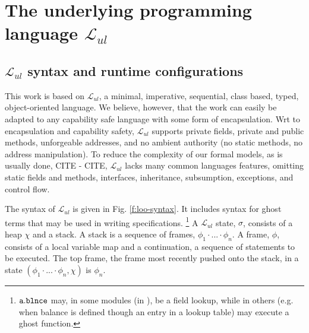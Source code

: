 \renewcommand{\LangOO}{\ensuremath{{\mathcal{L}}_{ul}}\xspace }

\section{The underlying programming language \LangOO}  
\label{sect:underlying}

\subsection{\LangOO syntax and runtime configurations}
\label{sub:Loo} 
This work is based on \LangOO, a {minimal}, imperative, sequential,  class based, typed, object-oriented language. 
We believe, however, that the work can easily be adapted to any capability safe language with some form of encapsulation. 
Wrt to encapsulation and  capability safety,  \LangOO supports private fields, private and public methods, unforgeable addresses, and no ambient authority (no static methods, no address manipulation).
To reduce the complexity of our formal models, as is usually done, CITE - CITE,  \LangOO lacks many
common languages features, omitting static fields and methods, interfaces,
inheritance, subsumption, exceptions, and control flow.  
 
 The syntax of \LangOO is given in Fig. \ref{f:loo-syntax}. It  includes syntax for ghost terms  %
 that may %
be used in writing
specifications.
\footnote{
\Eg  $\mbox{\normalfont{\texttt{a}}}.\mbox{\normalfont{\texttt{\mbox{\normalfont{\texttt{blnce}}}}}}$ may, in some modules (\eg in \ModA), be a field lookup, while in others (e.g. when  balance is defined though an entry in a lookup table) may execute   a ghost function. 
}%
 A \LangOO state, $\sigma$,  consists of a  heap $\chi$ and a stack. 
{A stack  is a sequence of frames, $\phi_1\!\cdot\!...\!\cdot\! \phi_n$.}
A  frame, $\phi$, consists of a local variable map and a continuation, \ie a sequence of statements to be executed.
The top frame, \ie  the frame most recently pushed onto the stack,  in a state $(\phi_1\!\cdot\!...\!\cdot\! \phi_n, \chi)$ is $\phi_n$.



